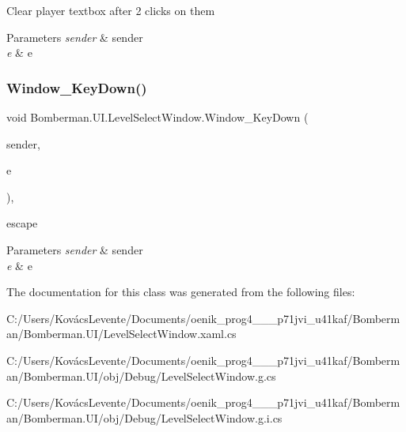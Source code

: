 Clear player textbox after 2 clicks on them 


\begin{DoxyParams}{Parameters}
{\em sender} & sender\\
\hline
{\em e} & e\\
\hline
\end{DoxyParams}
\mbox{\label{class_bomberman_1_1_u_i_1_1_level_select_window_ab8aee8635d86096021e5e3d915566f6c}} 
\subsubsection{\texorpdfstring{Window\_KeyDown()}{Window\_KeyDown()}}
{\footnotesize\ttfamily void Bomberman.\+U\+I.\+Level\+Select\+Window.\+Window\+\_\+\+Key\+Down (\begin{DoxyParamCaption}\item[{object}]{sender,  }\item[{System.\+Windows.\+Input.\+Key\+Event\+Args}]{e }\end{DoxyParamCaption})\hspace{0.3cm}{\ttfamily [inline]}, {\ttfamily [private]}}



escape 


\begin{DoxyParams}{Parameters}
{\em sender} & sender\\
\hline
{\em e} & e\\
\hline
\end{DoxyParams}


The documentation for this class was generated from the following files\+:\begin{DoxyCompactItemize}
\item 
C\+:/\+Users/\+Kovács\+Levente/\+Documents/oenik\+\_\+prog4\+\_\+\_\+\_\+p71jvi\+\_\+u41kaf/\+Bomberman/\+Bomberman.\+U\+I/Level\+Select\+Window.\+xaml.\+cs\item 
C\+:/\+Users/\+Kovács\+Levente/\+Documents/oenik\+\_\+prog4\+\_\+\_\+\_\+p71jvi\+\_\+u41kaf/\+Bomberman/\+Bomberman.\+U\+I/obj/\+Debug/Level\+Select\+Window.\+g.\+cs\item 
C\+:/\+Users/\+Kovács\+Levente/\+Documents/oenik\+\_\+prog4\+\_\+\_\+\_\+p71jvi\+\_\+u41kaf/\+Bomberman/\+Bomberman.\+U\+I/obj/\+Debug/Level\+Select\+Window.\+g.\+i.\+cs\end{DoxyCompactItemize}
